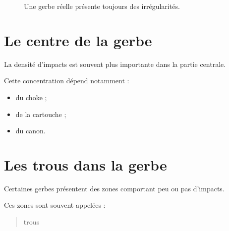 \begin{figure}[htbp]
\centering


\caption{Une gerbe réelle présente toujours des irrégularités.}
\label{fig:repartition_gerbe}

\end{figure}

\section{Le centre de la gerbe}

La densité d'impacts est souvent plus importante dans la partie centrale.

Cette concentration dépend notamment :

\begin{itemize}
    \item du choke ;
    \item de la cartouche ;
    \item du canon.
\end{itemize}

\section{Les trous dans la gerbe}

Certaines gerbes présentent des zones comportant peu ou pas d'impacts.

Ces zones sont souvent appelées :

\begin{quote}
trous
\end{quote}

